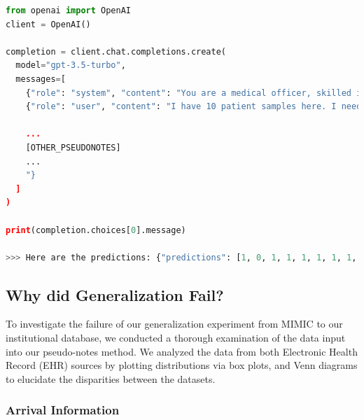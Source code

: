 \documentclass[pmlr]{jmlr}%
\begin{document}
\begin{lstlisting}[language=Python, caption=Basic Example of How prompted the gpt-3.5-turbo model to generate predictions.]
from openai import OpenAI
client = OpenAI()

completion = client.chat.completions.create(
  model="gpt-3.5-turbo",
  messages=[
    {"role": "system", "content": "You are a medical officer, skilled in determining whether a patient should be admitted to the Emergency Room or not."},
    {"role": "user", "content": "I have 10 patient samples here. I need you to predict whether each patient should be admitted to the emergency room or not. Give you prediction in the list format ([`1,0,0,1,1,1,0,1,0,1']) and predict 1 if they should be admitted and 0 if not:\n\n'Patient 10000032, a 52 year old white female, arrived via ambulance at 2180-05-06 19:17:00. The patient's marital status is widowed. The patient's insurance is other. The patient's language is english.The patient received the following diagnostic codes: ICD-9 code: [5728], oth sequela, chr liv dis. ICD-9 code: [78959], other ascites. ICD-9 code: [07070], unspecified viral hepatitis c without hepatic coma. ICD-9 code: [v08]...'

    ...
    [OTHER_PSEUDONOTES]
    ...
    "}
  ]
)

print(completion.choices[0].message)

>>> Here are the predictions: {"predictions": [1, 0, 1, 1, 1, 1, 1, 1, 1, 1]}
\end{lstlisting}

\subsection{Why did Generalization Fail?}
\label{gener3}


To investigate the failure of our generalization experiment from MIMIC to our institutional database, we conducted a thorough examination of the data input into our pseudo-notes method. We analyzed the data from both Electronic Health Record (EHR) sources by plotting distributions via box plots, and Venn diagrams to elucidate the disparities between the datasets.

\subsubsection*{Arrival Information}
\end{document}
